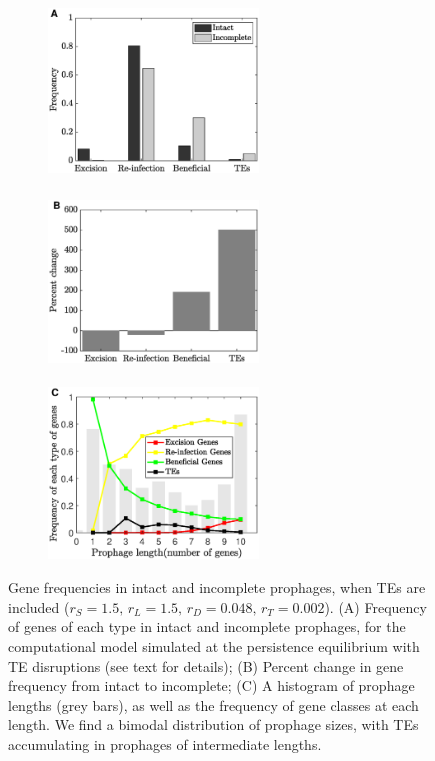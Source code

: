   \begin{figure}[H]
    \centering
     \begin{subfigure}[t]{0.30\textwidth} 
    \includegraphics[height=1.8in,width=2.2in]{BiTe180}
     \end{subfigure}\hfill
         \begin{subfigure}[t]{0.30\textwidth}
    \includegraphics[height=1.8in,width=2.2in]{BiTe280}
    \end{subfigure}\hfill
    \begin{subfigure}[t]{0.30\textwidth}
        \includegraphics[height=1.8in,width=2.2in]{BiTe3o}
    \end{subfigure}\hfill    
     \caption[Gene frequencies in intact and incomplete prophages, when TEs are included.]{Gene frequencies in intact and incomplete prophages, when TEs are included ($r_S = 1.5, \, r_L = 1.5, \, r_D = 0.048, \, r_T = 0.002$). (A) Frequency of genes of each type in intact and incomplete prophages, for the computational model simulated at the persistence equilibrium with TE disruptions (see text for details); (B) Percent change in gene frequency from intact to incomplete; (C) A histogram of prophage lengths (grey bars), as well as the frequency of gene classes at each length.  We find a bimodal distribution of prophage sizes, with TEs accumulating in prophages of intermediate lengths.}
     \label{fig:Biresults80}
     \end{figure} 
 
